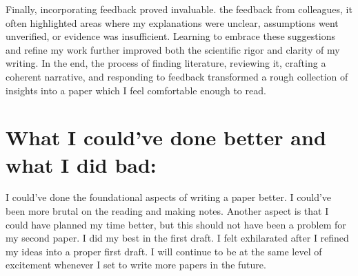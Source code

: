 \documentclass{article}[10pt]
\begin{document}
Finally, incorporating feedback proved invaluable. the feedback from colleagues, it often highlighted areas where my explanations were unclear, assumptions went unverified, or evidence was insufficient. Learning to embrace these suggestions and refine my work further improved both the scientific rigor and clarity of my writing. In the end, the process of finding literature, reviewing it, crafting a coherent narrative, and responding to feedback transformed a rough collection of insights into a paper which I feel comfortable enough to read. 
\section*{What I could've done better and what I did bad:}
I could've done the foundational aspects of writing a paper better. I could've been more brutal on the reading and making notes. Another aspect is that I could have planned my time better, but this should not have been a problem for my second paper. I did my best in the first draft. I felt exhilarated after I refined my ideas into a proper first draft. I will continue to be at the same level of excitement whenever I set to write more papers in the future.
\end{document}
